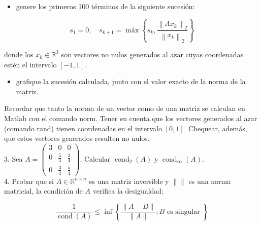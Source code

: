 \documentclass[10pt]{book}
\begin{document}
\begin{itemize}
  \item genere los primeros 100 términos de la siguiente sucesión:
\end{itemize}

$$
s_{1}=0, \quad s_{k+1}=\operatorname{máx}\left\{s_{k}, \frac{\left\|A x_{k}\right\|_{2}}{\left\|x_{k}\right\|_{2}}\right\}
$$

donde los $x_{k} \in \mathbb{R}^{3}$ son vectores no nulos generados al azar cuyas coordenadas estén el intervalo $[-1,1]$.

\begin{itemize}
  \item grafique la sucesión calculada, junto con el valor exacto de la norma de la matriz.
\end{itemize}

Recordar que tanto la norma de un vector como de una matriz se calculan en Matlab con el comando norm. Tener en cuenta que los vectores generados al azar (comando rand) tienen coordenadas en el intervalo $[0,1]$. Chequear, además, que estos vectores generados resulten no nulos.\\
3. Sea $A=\left(\begin{array}{ccc}3 & 0 & 0 \\ 0 & \frac{5}{4} & \frac{3}{4} \\ 0 & \frac{3}{4} & \frac{5}{4}\end{array}\right)$. Calcular $\operatorname{cond}_{2}(A)$ y $\operatorname{cond}_{\infty}(A)$.\\
4. Probar que si $A \in \mathbb{R}^{n \times n}$ es una matriz inversible y $\|\|$ es una norma matricial, la condición de $A$ verifica la desigualdad:

$$
\frac{1}{\operatorname{cond}(A)} \leq \inf \left\{\frac{\|A-B\|}{\|A\|}: B \text { es singular }\right\}
$$
\end{document}
